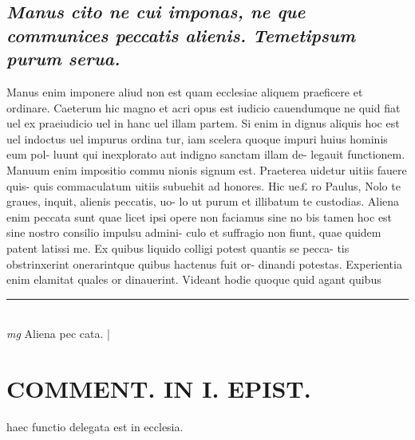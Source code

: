 \documentclass{article}
\begin{document}
\begin{pages}
\subsection*{\textit{Manus cito ne cui imponas, ne que communices peccatis alienis. Temetipsum purum serua. }}\pstart Manus enim imponere aliud non est quam ecclesiae aliquem praeficere et ordinare. Caeterum hic magno et acri opus est iudicio cauendumque ne quid fiat uel ex praeiudicio uel in hanc uel illam partem. Si enim in dignus aliquis hoc est uel indoctus uel impurus ordina tur, iam scelera quoque impuri huius hominis eum pol- luunt qui inexplorato aut indigno sanctam illam de- legauit functionem. Manuum enim impositio commu nionis signum est. Praeterea uidetur uitiis fauere quis- quis commaculatum uitiis subuehit ad honores. Hic ue£ ro Paulus, Nolo te graues, inquit, alienis peccatis, uo- lo ut purum et illibatum te custodias. Aliena enim peccata sunt quae licet ipsi opere non faciamus sine no bis tamen hoc est sine nostro consilio impulsu admini- culo et suffragio non fiunt, quae quidem patent latissi me. Ex quibus liquido colligi potest quantis se pecca- tis obstrinxerint onerarintque quibus hactenus fuit or- dinandi potestas. Experientia enim elamitat quales or dinauerint. Videant hodie quoque quid agant quibus  \pend
\vspace{0.5cm}\noindent
\vspace{0.2cm}\rule{1cm}{0.2pt}\\ 
\hspace{0.2cm}\textit{mg}
\footnotesize Aliena pec cata. 
\normalsize| 
\section*{COMMENT. IN I. EPIST. }\pstart haec functio delegata est in ecclesia.  \pend
{}
{}

\end{pages}
\end{document}
